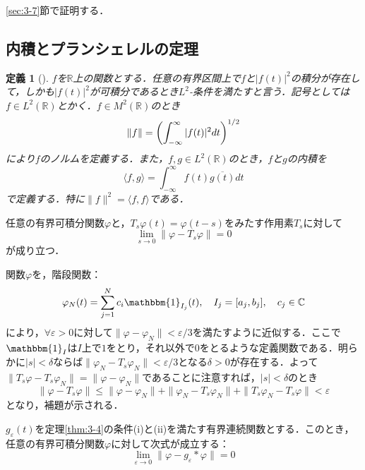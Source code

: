 \documentclass[dvipdfmx,a4j,10pt]{jsarticle}
\makeatletter
\theoremstyle{mystyle1}
\theoremstyle{mystyle3}
\theoremstyle{mystyle4}
\theoremstyle{mystyle6}
\newtheorem{definition}{定義}[section]
\theoremstyle{mystyle2}
\theoremstyle{mystyle5}
\newtheorem{theorem*}{定理}
\newtheorem{lemma*}{補題}
\renewenvironment{proof}[1][\proofname]{\par
  \pushQED{\qed}%
  \normalfont
  \topsep6\p@\@plus6\p@ \trivlist
  \item[\hskip\labelsep{\bfseries\sffamily #1}]\ignorespaces
}{%
  \popQED\endtrivlist\@endpefalse
}
\renewcommand\proofname{証明}
\newenvironment{dfn}[1][]
{\begin{tcolorbox}[
    enhanced,
    boxrule=0pt,
    arc=0mm,
    frame hidden,
    borderline west={2pt}{-4pt}{green!60!black},
    breakable = true
    ]
    \begin{definition}[#1]
}
{\end{definition}\end{tcolorbox}}
\newenvironment{thm*}[1][]
{\begin{tcolorbox}[
    enhanced,
    boxrule=0pt,
    arc=0mm,
    frame hidden,
    borderline west={2pt}{-4pt}{red},
    breakable = true
    ]
    \begin{theorem*}[#1]
}
{\end{theorem*}\end{tcolorbox}}
\newenvironment{lem*}[1][]
{\begin{tcolorbox}[
    enhanced,
    boxrule=0pt,
    arc=0mm,
    frame hidden,
    borderline west={2pt}{-4pt}{yellow!90!black},
    breakable = true
    ]
    \begin{lemma*}[#1]
}
{\end{lemma*}\end{tcolorbox}}
\makeatother
\begin{document}
\begin{proof}
	\ref{sec:3-7}節で証明する．
\end{proof}

\subsection{内積とプランシェレルの定理}

\begin{dfn}
	$f$を$\mathbb{R}$上の関数とする．任意の有界区間上で$f$と$|f(t)|^2$の積分が存在して，しかも$|f(t)|^2$が可積分であるとき$L^2$-条件を満たすと言う．記号としては$f\in L^2(\mathbb{R})$とかく．$f\in M^2(\mathbb{R})$のとき
	\[
		\|f\|=\mleft(\int_{-\infty}^\infty |f(t)|^2dt\mright)^{1/2}
	\]
	により$f$のノルムを定義する．また，$f,g\in L^2(\mathbb{R})$のとき，$f$と$g$の内積を
	\[
		\langle f,g \rangle=\int_{-\infty}^\infty f(t)\overline{g(t)}dt
	\]
	で定義する．特に$\|f\|^2=\langle f,f \rangle$である．
\end{dfn}

\begin{lem*}
	任意の有界可積分関数$\varphi$と，$T_s\varphi(t)=\varphi(t-s)$をみたす作用素$T_s$に対して
	\[
		\lim_{s\to 0}\|\varphi -T_s\varphi\|=0
	\]
	が成り立つ．
\end{lem*}

\begin{proof}
	関数$\varphi$を，階段関数：
	\[
		\varphi_N(t)=\sum_{j=1}^N c_i\mathbbm{1}_{I_j}(t),\quad I_j=[a_j,b_j],\quad c_j\in\mathbb{C}
	\]
	により，$\forall\varepsilon>0$に対して$\|\varphi-\varphi_N\|<\varepsilon/3$を満たすように近似する．ここで$\mathbbm{1}_I$は$I$上で$1$をとり，それ以外で$0$をとるような定義関数である．明らかに$|s|<\delta$ならば$\|\varphi_N-T_s\varphi_N\|<\varepsilon/3$となる$\delta>0$が存在する．よって$\|T_s\varphi-T_s\varphi_N\|=\|\varphi-\varphi_N\|$であることに注意すれば，$|s|<\delta$のとき
	\[
		\|\varphi-T_s\varphi\|\leq\|\varphi-\varphi_N\|+\|\varphi_N-T_s\varphi_N\|+\|T_s\varphi_N-T_s\varphi\|<\varepsilon
	\]
	となり，補題が示される．
\end{proof}

\begin{thm*}
	$g_\varepsilon(t)$を定理\ref{thm:3-4}の条件(i)と(ii)を満たす有界連続関数とする．このとき，任意の有界可積分関数$\varphi$に対して次式が成立する：
	\[
		\lim_{\varepsilon\to 0}\|\varphi-g_\varepsilon*\varphi\|=0
	\]
\end{thm*}
\end{document}
